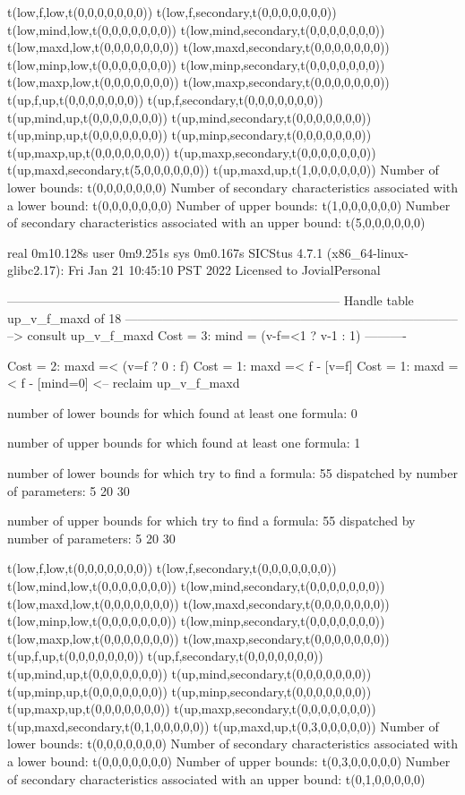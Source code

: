 t(low,f,low,t(0,0,0,0,0,0,0))
t(low,f,secondary,t(0,0,0,0,0,0,0))
t(low,mind,low,t(0,0,0,0,0,0,0))
t(low,mind,secondary,t(0,0,0,0,0,0,0))
t(low,maxd,low,t(0,0,0,0,0,0,0))
t(low,maxd,secondary,t(0,0,0,0,0,0,0))
t(low,minp,low,t(0,0,0,0,0,0,0))
t(low,minp,secondary,t(0,0,0,0,0,0,0))
t(low,maxp,low,t(0,0,0,0,0,0,0))
t(low,maxp,secondary,t(0,0,0,0,0,0,0))
t(up,f,up,t(0,0,0,0,0,0,0))
t(up,f,secondary,t(0,0,0,0,0,0,0))
t(up,mind,up,t(0,0,0,0,0,0,0))
t(up,mind,secondary,t(0,0,0,0,0,0,0))
t(up,minp,up,t(0,0,0,0,0,0,0))
t(up,minp,secondary,t(0,0,0,0,0,0,0))
t(up,maxp,up,t(0,0,0,0,0,0,0))
t(up,maxp,secondary,t(0,0,0,0,0,0,0))
t(up,maxd,secondary,t(5,0,0,0,0,0,0))
t(up,maxd,up,t(1,0,0,0,0,0,0))
Number of lower bounds:                                             t(0,0,0,0,0,0,0)
Number of secondary characteristics associated with a lower bound:  t(0,0,0,0,0,0,0)
Number of upper bounds:                                             t(1,0,0,0,0,0,0)
Number of secondary characteristics associated with an upper bound: t(5,0,0,0,0,0,0)

real	0m10.128s
user	0m9.251s
sys	0m0.167s
SICStus 4.7.1 (x86_64-linux-glibc2.17): Fri Jan 21 10:45:10 PST 2022
Licensed to JovialPersonal


--------------------------------------------------------------------------------
Handle table up_v_f_maxd of 18
--------------------------------------------------------------------------------
--> consult up_v_f_maxd
Cost =  3:  mind = (v-f=<1 ? v-1 : 1)
----------

Cost =  2:  maxd =< (v=f ? 0 : f)
Cost =  1:  maxd =< f - [v=f] %
Cost =  1:  maxd =< f - [mind=0] %
<-- reclaim up_v_f_maxd

number of lower bounds for which found at least one formula: 0

number of upper bounds for which found at least one formula: 1

number of lower bounds for which try to find a formula: 55
dispatched by number of parameters: 5  20  30

number of upper bounds for which try to find a formula: 55
dispatched by number of parameters: 5  20  30

t(low,f,low,t(0,0,0,0,0,0,0))
t(low,f,secondary,t(0,0,0,0,0,0,0))
t(low,mind,low,t(0,0,0,0,0,0,0))
t(low,mind,secondary,t(0,0,0,0,0,0,0))
t(low,maxd,low,t(0,0,0,0,0,0,0))
t(low,maxd,secondary,t(0,0,0,0,0,0,0))
t(low,minp,low,t(0,0,0,0,0,0,0))
t(low,minp,secondary,t(0,0,0,0,0,0,0))
t(low,maxp,low,t(0,0,0,0,0,0,0))
t(low,maxp,secondary,t(0,0,0,0,0,0,0))
t(up,f,up,t(0,0,0,0,0,0,0))
t(up,f,secondary,t(0,0,0,0,0,0,0))
t(up,mind,up,t(0,0,0,0,0,0,0))
t(up,mind,secondary,t(0,0,0,0,0,0,0))
t(up,minp,up,t(0,0,0,0,0,0,0))
t(up,minp,secondary,t(0,0,0,0,0,0,0))
t(up,maxp,up,t(0,0,0,0,0,0,0))
t(up,maxp,secondary,t(0,0,0,0,0,0,0))
t(up,maxd,secondary,t(0,1,0,0,0,0,0))
t(up,maxd,up,t(0,3,0,0,0,0,0))
Number of lower bounds:                                             t(0,0,0,0,0,0,0)
Number of secondary characteristics associated with a lower bound:  t(0,0,0,0,0,0,0)
Number of upper bounds:                                             t(0,3,0,0,0,0,0)
Number of secondary characteristics associated with an upper bound: t(0,1,0,0,0,0,0)

